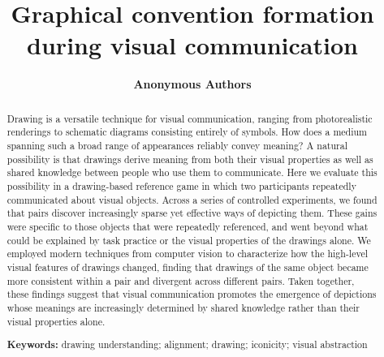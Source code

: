 \documentclass[10pt,letterpaper]{article}
\title{Graphical convention formation during visual communication}
\author{\large \bf Anonymous Authors}
\begin{document}
\maketitle

\begin{abstract}
Drawing is a versatile technique for visual communication, ranging from photorealistic renderings to schematic diagrams consisting entirely of symbols.
How does a medium spanning such a broad range of appearances reliably convey meaning?
A natural possibility is that drawings derive meaning from both their visual properties as well as shared knowledge between people who use them to communicate.
Here we evaluate this possibility in a drawing-based reference game in which two participants repeatedly communicated about visual objects.
Across a series of controlled experiments, we found that pairs discover increasingly sparse yet effective ways of depicting them.
These gains were specific to those objects that were repeatedly referenced, and went beyond what could be explained by task practice or the visual properties of the drawings alone.
We employed modern techniques from computer vision to characterize how the high-level visual features of drawings changed, finding that drawings of the same object became more consistent within a pair and divergent across different pairs.
Taken together, these findings suggest that visual communication promotes the emergence of depictions whose meanings are increasingly determined by shared knowledge rather than their visual properties alone.

\textbf{Keywords:}
drawing understanding; alignment; drawing; iconicity; visual abstraction


\end{abstract}
\end{document}

